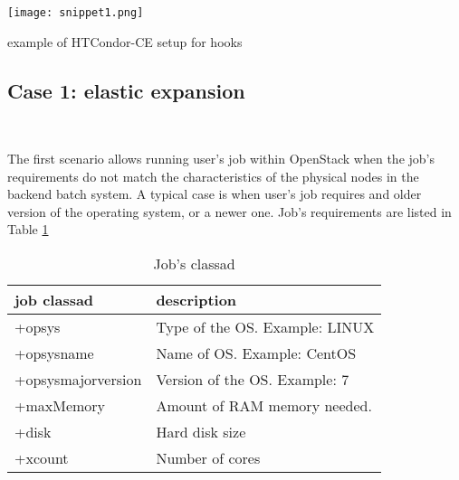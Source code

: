 \documentclass[a4paper]{jpconf}
\begin{document}

\begin{snippet}[h]
    \renewcommand\figurename{Snippet}
    \centering
    \texttt{[image: snippet1.png]}
    \caption{example of HTCondor-CE setup for hooks}
    \label{snip:snippet1}
\end{snippet}


\subsection{Case 1: elastic expansion}

~

The first scenario allows running user's job within OpenStack when
the job's requirements do not match the characteristics of the physical nodes in
the backend batch system.
A typical case is when user's job requires and older version of the operating
system, or a newer one.
Job's requirements are listed in Table \ref{table:classad1}


\begin{table}[h]
\centering
\begin{tabular}{ l l }
  \hline
  \textbf{job classad} & \textbf{description} \\
  \hline
  +opsys & Type of the OS. Example: LINUX  \\
  +opsysname & Name of OS. Example: CentOS \\
  +opsysmajorversion & Version of the OS. Example: 7 \\
  +maxMemory & Amount of RAM memory needed. \\
  +disk & Hard disk size \\
  +xcount & Number of cores \\
  \hline
\end{tabular}
\caption{Job's classad}
\label{table:classad1}
\end{table}
\end{document}
